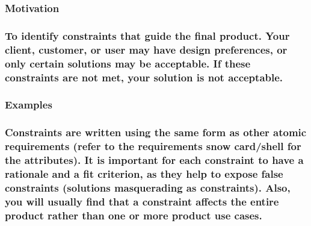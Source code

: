 \documentclass[
]{article}
\begin{document}
\hypertarget{motivation-10}{%
\subsubsection{Motivation}\label{motivation-10}}

\hypertarget{to-identify-constraints-that-guide-the-final-product.-your-client-customer-or-user-may-have-design-preferences-or-only-certain-solutions-may-be-acceptable.-if-these-constraints-are-not-met-your-solution-is-not-acceptable.}{%
\subsubsection{To identify constraints that guide the final product.
Your client, customer, or user may have design preferences, or only
certain solutions may be acceptable. If these constraints are not met,
your solution is not
acceptable.}\label{to-identify-constraints-that-guide-the-final-product.-your-client-customer-or-user-may-have-design-preferences-or-only-certain-solutions-may-be-acceptable.-if-these-constraints-are-not-met-your-solution-is-not-acceptable.}}

\hypertarget{examples-2}{%
\subsubsection{Examples}\label{examples-2}}

\hypertarget{constraints-are-written-using-the-same-form-as-other-atomic-requirements-refer-to-the-requirements-snow-cardshell-for-the-attributes.-it-is-important-for-each-constraint-to-have-a-rationale-and-a-fit-criterion-as-they-help-to-expose-false-constraints-solutions-masquerading-as-constraints.-also-you-will-usually-find-that-a-constraint-affects-the-entire-product-rather-than-one-or-more-product-use-cases.}{%
\subsubsection{Constraints are written using the same form as other
atomic requirements (refer to the requirements snow card/shell for the
attributes). It is important for each constraint to have a rationale and
a fit criterion, as they help to expose false constraints (solutions
masquerading as constraints). Also, you will usually find that a
constraint affects the entire product rather than one or more product
use
cases.}\label{constraints-are-written-using-the-same-form-as-other-atomic-requirements-refer-to-the-requirements-snow-cardshell-for-the-attributes.-it-is-important-for-each-constraint-to-have-a-rationale-and-a-fit-criterion-as-they-help-to-expose-false-constraints-solutions-masquerading-as-constraints.-also-you-will-usually-find-that-a-constraint-affects-the-entire-product-rather-than-one-or-more-product-use-cases.}}
\end{document}

